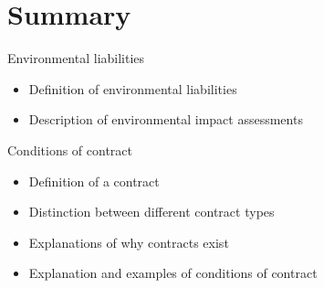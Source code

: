 \section{Summary}
Environmental liabilities
\begin{itemize}
    \item Definition of environmental liabilities
    \item Description of environmental impact assessments
\end{itemize}
Conditions of contract
\begin{itemize}
    \item Definition of a contract
    \item Distinction between different contract types
    \item Explanations of why contracts exist
    \item Explanation and examples of conditions of contract
\end{itemize}